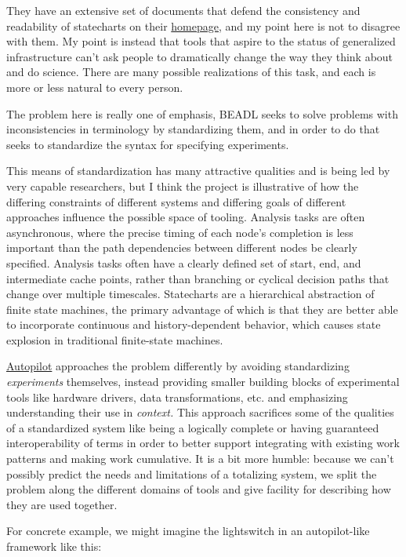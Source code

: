 \documentclass[10pt]{article}
\begin{document}
\begin{multicols}{2}
They have an extensive set of documents that defend the consistency and
readability of statecharts on their
\href{https://statecharts.dev/}{homepage}, and my point here is not to
disagree with them. My point is instead that tools that aspire to the
status of generalized infrastructure can't ask people to dramatically
change the way they think about and do science. There are many possible
realizations of this task, and each is more or less natural to every
person.

The problem here is really one of emphasis, BEADL seeks to solve
problems with inconsistencies in terminology by standardizing them, and
in order to do that seeks to standardize the syntax for specifying
experiments.

This means of standardization has many attractive qualities and is being
led by very capable researchers, but I think the project is illustrative
of how the differing constraints of different systems and differing
goals of different approaches influence the possible space of tooling.
Analysis tasks are often asynchronous, where the precise timing of each
node's completion is less important than the path dependencies between
different nodes be clearly specified. Analysis tasks often have a
clearly defined set of start, end, and intermediate cache points, rather
than branching or cyclical decision paths that change over multiple
timescales. Statecharts are a hierarchical abstraction of finite state
machines, the primary advantage of which is that they are better able to
incorporate continuous and history-dependent behavior, which causes
state explosion in traditional finite-state machines.

\href{https://docs.auto-pi-lot.com}{Autopilot} \cite{saundersAutopilotAutomatingBehavioral2019}  approaches the problem
differently by avoiding standardizing \emph{experiments} themselves,
instead providing smaller building blocks of experimental tools like
hardware drivers, data transformations, etc. and emphasizing
understanding their use in \emph{context.} This approach sacrifices some
of the qualities of a standardized system like being a logically
complete or having guaranteed interoperability of terms in order to
better support integrating with existing work patterns and making work
cumulative. It is a bit more humble: because we can't possibly predict
the needs and limitations of a totalizing system, we split the problem
along the different domains of tools and give facility for describing
how they are used together.

For concrete example, we might imagine the lightswitch in an
autopilot-like framework like this:


\end{multicols}
\end{document}
